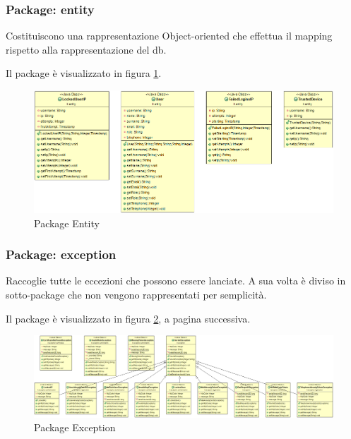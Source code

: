 \subsubsection{Package: \textbf{entity}}

Costituiscono una rappresentazione Object-oriented che effettua il mapping rispetto alla rappresentazione del db.

Il package è visualizzato in figura \ref{gfx:dependencies_entity}.

\begin{figure}[!htbp]
	\centering
	\includegraphics[scale = .4]{img/dependencies_entity}
	\caption{Package Entity}
	\label{gfx:dependencies_entity}
\end{figure}

\subsubsection{Package: \textbf{exception}}

Raccoglie tutte le eccezioni che possono essere lanciate. A sua volta è diviso in sotto-package che non vengono rappresentati per semplicità.

Il package è visualizzato in figura \ref{gfx:dependencies_exception}, a pagina successiva.

\tiny 
\begin{landscape}
\begin{center}
\vspace*{\fill}
\begin{figure}[!htbp]
	\centering
	\includegraphics[scale = .3]{img/dependencies_exception}
	\caption{Package Exception}
	\label{gfx:dependencies_exception}
\end{figure}
\vspace*{\fill}

\end{center}	

\end{landscape}%

